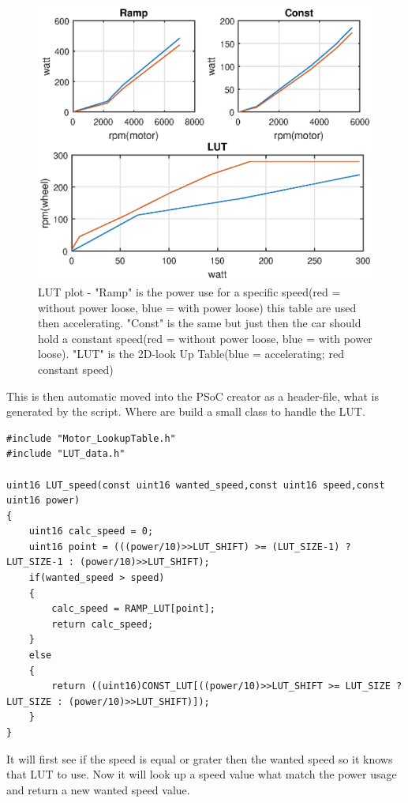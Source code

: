 \begin{figure}[H]
	\centering
	\includegraphics [width=6in]{Software/Pictures/LUT.eps}
	\caption{LUT plot - "Ramp" is the power use for a specific speed(red = without power loose, blue = with power loose) this table are used then accelerating. "Const" is the same but just then the car should hold a constant speed(red = without power loose, blue = with power loose). "LUT" is the 2D-look Up Table(blue = accelerating; red constant speed)}
	\label{fig:LUT_plot}
\end{figure}

This is then automatic moved into the PSoC creator as a header-file, what is generated by the script. Where are build a small class to handle the LUT.


\lstset{language=C}
\begin{lstlisting}
#include "Motor_LookupTable.h"
#include "LUT_data.h"

uint16 LUT_speed(const uint16 wanted_speed,const uint16 speed,const uint16 power)
{
	uint16 calc_speed = 0;
	uint16 point = (((power/10)>>LUT_SHIFT) >= (LUT_SIZE-1) ? LUT_SIZE-1 : (power/10)>>LUT_SHIFT);
	if(wanted_speed > speed)
	{
		calc_speed = RAMP_LUT[point];
		return calc_speed;
	}
	else
	{
		return ((uint16)CONST_LUT[((power/10)>>LUT_SHIFT >= LUT_SIZE ? LUT_SIZE : (power/10)>>LUT_SHIFT)]);
	}
}
\end{lstlisting}

It will first see if the speed is equal or grater then the wanted speed so it knows that LUT to use. Now it will look up a speed value what match the power usage and return a new wanted speed value.



